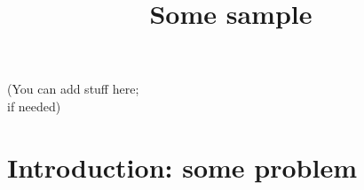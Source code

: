 
\title{Some sample}




\begin{frame}
\titlepage
\begin{center}

(You can add stuff here;\\ if needed)


\end{center}

\end{frame}

\section{Introduction: some problem}


